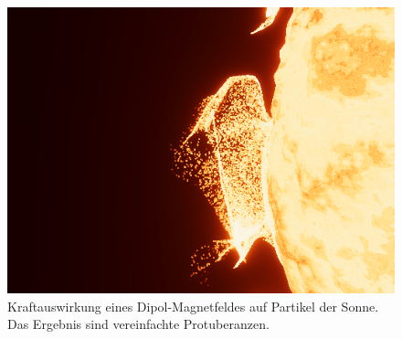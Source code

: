 \begin{figure}
  \includegraphics[width=\columnwidth]{flare}
  \caption{Kraftauswirkung eines Dipol-Magnetfeldes auf Partikel der Sonne. Das Ergebnis sind vereinfachte Protuberanzen.}
  \label{fig:flare}
\end{figure}